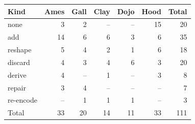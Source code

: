 \begin{tabular}{@{}lrrrrrr@{}}
\toprule
Kind & Ames & Gall & Clay & Dojo & Hood & Total \\
\midrule
none & 3 & 2 & -- & -- & 15 & 20 \\
add & 14 & 6 & 6 & 3 & 6 & 35 \\
reshape & 5 & 4 & 2 & 1 & 6 & 18 \\
discard & 4 & 3 & 4 & 6 & 3 & 20 \\
derive & 4 & -- & 1 & -- & 3 & 8 \\
repair & 3 & 4 & -- & -- & -- & 7 \\
re-encode & -- & 1 & 1 & 1 & -- & 3 \\
\midrule
Total & 33 & 20 & 14 & 11 & 33 & 111 \\
\bottomrule
\end{tabular}

